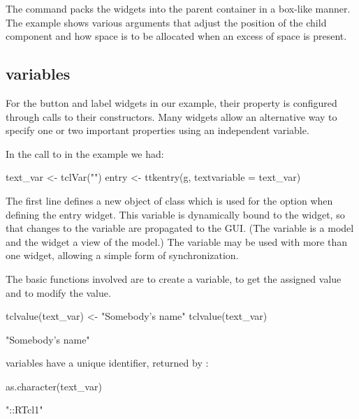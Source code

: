 The  command packs the widgets into the parent container
in a box-like manner. The example shows various arguments that adjust
the position of the child component and how space is to be allocated
when an excess of space is present.



\subsection{\TCL\/ variables}
\label{sec:tcltk:overview:textvariables}


For the button and label widgets in our example, their 
property is configured through calls to their constructors. Many
widgets allow an alternative way to specify one or two important
properties using an independent \Tcl\/ variable.

In the call to  in the example we had:

\begin{Schunk}
\begin{Sinput}
 text_var <- tclVar("")
 entry <- ttkentry(g, textvariable = text_var)
\end{Sinput}
\end{Schunk}
%
The first line defines a new object of class  which is
used for the  option when defining the entry
widget. This variable is dynamically bound to the widget, so that
changes to the variable are propagated to the GUI. (The \TCL\/
variable is a model and the widget a view of the model.)  The \Tcl{}
variable may be used with more than one widget, allowing a simple form
of synchronization.

The basic functions involved are  to create a \TCL\/
variable,  to get the assigned value and
 to modify the value.

\begin{Schunk}
\begin{Sinput}
 tclvalue(text_var) <- "Somebody's name"
 tclvalue(text_var)
\end{Sinput}
\begin{Soutput}
[1] "Somebody's name"
\end{Soutput}
\end{Schunk}

\TCL\/ variables have a unique identifier, returned by :
\begin{Schunk}
\begin{Sinput}
 as.character(text_var)
\end{Sinput}
\begin{Soutput}
[1] "::RTcl1"
\end{Soutput}
\end{Schunk}

